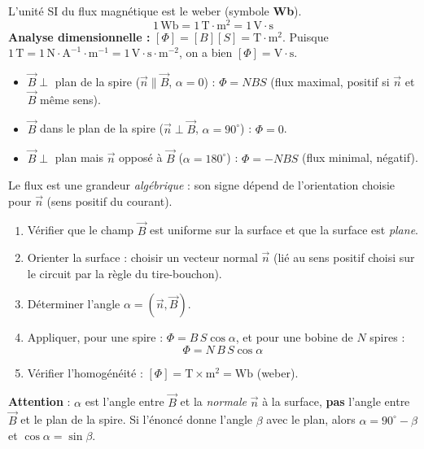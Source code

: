 \documentclass[11pt]{article}
\newcommand{\cle}[1]{{\popxbold\color{popdark}#1}}
\begin{document}
\begin{propriete}
L'unité SI du flux magnétique est le \cle{weber} (symbole \textbf{Wb}).
\[ 1\,\mathrm{Wb} = 1\,\mathrm{T}\cdot\mathrm{m}^2 = 1\,\mathrm{V}\cdot\mathrm{s} \]
\textbf{Analyse dimensionnelle :} $[\Phi] = [B][S] = \mathrm{T}\cdot\mathrm{m}^2$. Puisque $1\,\mathrm{T} = 1\,\mathrm{N}\cdot\mathrm{A}^{-1}\cdot\mathrm{m}^{-1} = 1\,\mathrm{V}\cdot\mathrm{s}\cdot\mathrm{m}^{-2}$, on a bien $[\Phi] = \mathrm{V}\cdot\mathrm{s}$.
\end{propriete}

\begin{aretenir}
\begin{itemize}
\item $\vec{B} \perp$ plan de la spire ($\vec{n} \parallel \vec{B}$, $\alpha = 0$) : $\Phi = NBS$ (flux maximal, positif si $\vec{n}$ et $\vec{B}$ même sens).
\item $\vec{B}$ dans le plan de la spire ($\vec{n} \perp \vec{B}$, $\alpha = 90^\circ$) : $\Phi = 0$.
\item $\vec{B} \perp$ plan mais $\vec{n}$ opposé à $\vec{B}$ ($\alpha = 180^\circ$) : $\Phi = -NBS$ (flux minimal, négatif).
\end{itemize}
Le flux est une grandeur \emph{algébrique} : son signe dépend de l'orientation choisie pour $\vec{n}$ (sens positif du courant).
\end{aretenir}

\begin{methode}
\begin{enumerate}
\item Vérifier que le champ $\vec{B}$ est \cle{uniforme} sur la surface et que la surface est \emph{plane}.
\item Orienter la surface : choisir un vecteur normal $\vec{n}$ (lié au sens positif choisi sur le circuit par la règle du tire-bouchon).
\item Déterminer l'angle $\alpha = (\vec{n}, \vec{B})$.
\item Appliquer, pour une spire : $\Phi = B\,S\cos\alpha$, et pour une bobine de $N$ spires :
\[ \Phi = N\,B\,S\cos\alpha \]
\item Vérifier l'homogénéité : $[\Phi] = \mathrm{T}\times\mathrm{m}^2 = \mathrm{Wb}$ (weber).
\end{enumerate}
\textbf{Attention} : $\alpha$ est l'angle entre $\vec{B}$ et la \emph{normale} $\vec{n}$ à la surface, \textbf{pas} l'angle entre $\vec{B}$ et le plan de la spire. Si l'énoncé donne l'angle $\beta$ avec le plan, alors $\alpha = 90^\circ - \beta$ et $\cos\alpha = \sin\beta$.
\end{methode}
\end{document}
